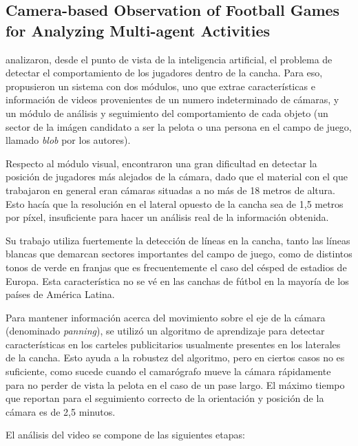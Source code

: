 \documentclass[a4paper,10pt]{article}
\begin{document}
\subsection{Camera-based Observation of Football Games for Analyzing Multi-agent Activities}

\citeauthor*{beetz-05, beetz-06} analizaron, desde el punto de vista de la inteligencia artificial,
el problema de detectar el comportamiento de los jugadores dentro de la cancha. Para eso, propusieron
un sistema con dos módulos, uno que extrae características e información de videos provenientes de
un numero indeterminado de cámaras, y un módulo de análisis y seguimiento del comportamiento de cada
objeto (un sector de la imágen candidato a ser la pelota o una persona en el campo de juego, 
llamado \textit{blob} por los autores).

Respecto al módulo visual, encontraron una gran dificultad en detectar la posición de jugadores más alejados
de la cámara, dado que el material con el que trabajaron en general eran cámaras situadas a no más de
18 metros de altura. Esto hacía que la resolución en el lateral opuesto de la cancha sea de 1,5 metros por píxel,
insuficiente para hacer un análisis real de la información obtenida.

Su trabajo utiliza fuertemente la detección de líneas en la cancha, tanto las líneas blancas que demarcan sectores
importantes del campo de juego, como de distintos tonos de verde en franjas que es frecuentemente el caso del césped de
estadios de Europa. Esta característica no se vé en las canchas de fútbol en la mayoría de los países de América Latina.

Para mantener información acerca del movimiento sobre el eje de la cámara (denominado \textit{panning}), se utilizó
un algoritmo de aprendizaje para detectar características en los carteles publicitarios usualmente presentes en los
laterales de la cancha. Esto ayuda a la robustez del algoritmo, pero en ciertos casos no es suficiente, como sucede
cuando el camarógrafo mueve la cámara rápidamente para no perder de vista la pelota en el caso de un pase largo.
El máximo tiempo que reportan para el seguimiento correcto de la orientación y posición de la cámara es de 2,5 minutos.

El análisis del video se compone de las siguientes etapas:
\end{document}
